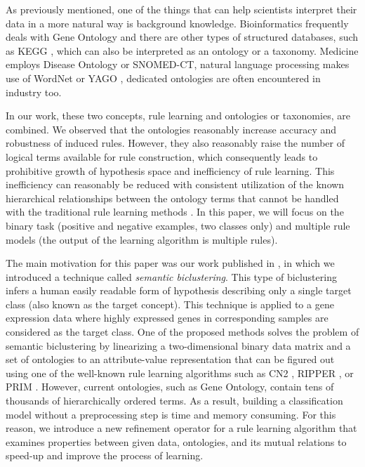 \documentclass{bmcart}
\begin{document}
As previously mentioned, one of the things that can help scientists interpret their data in a more natural way is background knowledge.
Bioinformatics frequently deals with Gene Ontology  \cite{ashburner2000gene,gene2016expansion} and there are other types of structured databases, such as KEGG \cite{kanehisa2016kegg,kanehisa2015kegg,kanehisa2000kegg}, which can also be interpreted as an ontology or a taxonomy. Medicine employs Disease Ontology \cite{schriml2011disease,kibbe2014disease} or SNOMED-CT, natural language processing makes use of WordNet \cite{miller1995wordnet} or YAGO \cite{suchanek2007yago}, dedicated ontologies are often encountered in industry too.  

In our work, these two concepts, rule learning and ontologies or taxonomies, are combined. We observed that the ontologies reasonably increase accuracy and robustness of induced rules. However, they also reasonably raise the number of logical terms available for rule construction, which consequently leads to prohibitive growth of hypothesis space and inefficiency of rule learning. This inefficiency can reasonably be reduced with consistent utilization of the known hierarchical relationships between the ontology terms that cannot be handled with the traditional rule learning methods \cite{clark1989cn2,cohen1995fast}. In this paper, we will focus on the binary task (positive and negative examples, two classes only) and multiple rule models (the output of the learning algorithm is multiple rules).

The main motivation for this paper was our work published in \cite{klema2017semantic}, in which we introduced a technique called \emph{semantic biclustering}. This type of biclustering infers a human easily readable form of hypothesis describing only a single target class (also known as the target concept). This technique is applied to a gene expression data where highly expressed genes in corresponding samples are considered as the target class. One of the proposed methods solves the problem of semantic biclustering by linearizing a two-dimensional binary data matrix and a set of ontologies to an attribute-value representation that can be figured out using one of the well-known rule learning algorithms such as CN2 \cite{clark1989cn2,clark1991rule}, RIPPER \cite{cohen1995fast}, or PRIM \cite{friedman1999bump}. However, current ontologies, such as Gene Ontology, contain tens of thousands of hierarchically ordered terms. As a result, building a classification model without a preprocessing step is time and memory consuming. For this reason, we introduce a new refinement operator for a rule learning algorithm that examines properties between given data, ontologies, and its mutual relations to speed-up and improve the process of learning.
\end{document}
